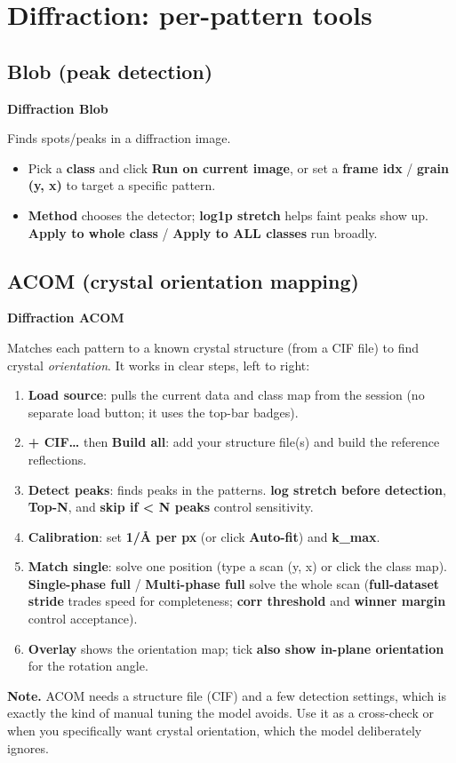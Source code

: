 \documentclass[11pt]{article}
\newcommand{\btn}[1]{\textbf{#1}}
\newcommand{\tab}[1]{\textsf{\textbf{#1}}}
\newcommand{\note}[1]{\par\smallskip\noindent\colorbox{soft}{\parbox{\dimexpr\linewidth-2\fboxsep}{\textbf{Note.} #1}}\par\smallskip}
\begin{document}
\section{Diffraction: per-pattern tools}
\subsection{Blob (peak detection)}
\tab{Diffraction \textrightarrow{} Blob}

Finds spots/peaks in a diffraction image.
\begin{itemize}[itemsep=2pt]
\item Pick a \textbf{class} and click \btn{Run on current image}, or set a
\textbf{frame idx} / \textbf{grain (y, x)} to target a specific pattern.
\item \textbf{Method} chooses the detector; \textbf{log1p stretch} helps faint
peaks show up. \btn{Apply to whole class} / \btn{Apply to ALL classes} run broadly.
\end{itemize}

\subsection{ACOM (crystal orientation mapping)}
\tab{Diffraction \textrightarrow{} ACOM}

Matches each pattern to a known crystal structure (from a CIF file) to find crystal
\emph{orientation}. It works in clear steps, left to right:
\begin{enumerate}[itemsep=3pt]
\item \btn{Load source}: pulls the current data and class map from the session (no
separate load button; it uses the top-bar badges).
\item \btn{+ CIF\dots} then \btn{Build all}: add your structure file(s) and build
the reference reflections.
\item \btn{Detect peaks}: finds peaks in the patterns. \textbf{log stretch before
detection}, \textbf{Top-N}, and \textbf{skip if < N peaks} control sensitivity.
\item \textbf{Calibration}: set \textbf{1/\AA{} per px} (or click \btn{Auto-fit})
and \textbf{k\_max}.
\item \btn{Match single}: solve one position (type a scan (y, x) or click the class
map). \btn{Single-phase full} / \btn{Multi-phase full} solve the whole scan
(\textbf{full-dataset stride} trades speed for completeness; \textbf{corr
threshold} and \textbf{winner margin} control acceptance).
\item \btn{Overlay} shows the orientation map; tick \textbf{also show in-plane
orientation} for the rotation angle.
\end{enumerate}
\note{ACOM needs a structure file (CIF) and a few detection settings, which is
exactly the kind of manual tuning the model avoids. Use it as a cross-check or when
you specifically want crystal orientation, which the model deliberately ignores.}
\end{document}
